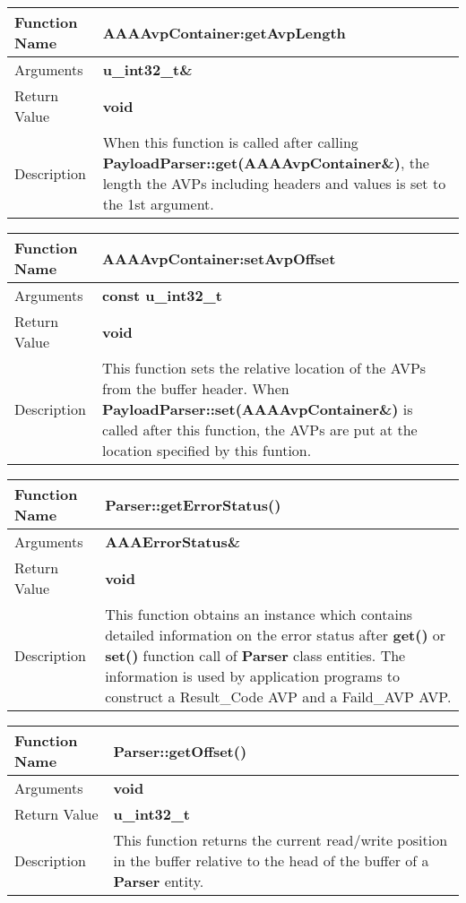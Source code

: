 \begin{flushleft}
\begin{tabular}[t]{|l|p{3in}|}\hline
 Function Name & {\bf AAAAvpContainer:getAvpLength}
\\\hline
 Arguments & {\bf u\_int32\_t\&}
\\\hline
 Return Value & {\bf void}
\\\hline
 Description &  
 When this function is called after calling {\bf
 PayloadParser::get(AAAAvpContainer\&)}, 
 the length the AVPs including headers and values is set to the 1st argument.
 \\\hline
\end{tabular}
\end{flushleft}

\begin{flushleft}
\begin{tabular}[t]{|l|p{3in}|}\hline
 Function Name & {\bf AAAAvpContainer:setAvpOffset}
\\\hline
 Arguments & {\bf const u\_int32\_t}
\\\hline
 Return Value & {\bf void}
\\\hline
 Description &  
 This function sets the relative location of the AVPs from the
 buffer header.  When {\bf PayloadParser::set(AAAAvpContainer\&)} 
 is called after this function, the AVPs are put at the location 
 specified by this funtion.
 \\\hline
\end{tabular}
\end{flushleft}

\begin{flushleft}
\begin{tabular}[t]{|l|p{3in}|}\hline
 Function Name & {\bf Parser::getErrorStatus()}
\\\hline
 Arguments & {\bf AAAErrorStatus\&}
\\\hline
 Return Value & {\bf void}
\\\hline
 Description &  

 This function obtains an instance which contains detailed information
 on the error status after {\bf get()} or {\bf set()} function call 
 of {\bf Parser} class entities.
 The information is used by application programs to construct 
 a Result\_Code AVP and a Faild\_AVP AVP.  \\\hline
\end{tabular}
\end{flushleft}

\begin{flushleft}
\begin{tabular}[t]{|l|p{3in}|}\hline
 Function Name & {\bf Parser::getOffset()}
\\\hline
 Arguments & {\bf void}
\\\hline
 Return Value & {\bf u\_int32\_t}
\\\hline
 Description &  

 This function returns the current read/write position in the buffer 
 relative to the head of the buffer of a {\bf Parser} entity.  
 \\\hline
\end{tabular}
\end{flushleft}


